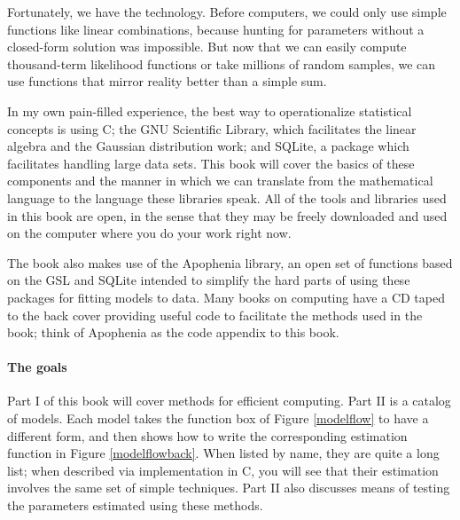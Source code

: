 Fortunately, we have the technology. Before computers, we could only
use simple functions like linear combinations, because hunting for
parameters without a closed-form solution was impossible. 
But now that we can easily compute thousand-term likelihood functions
or take millions of random samples, we can use functions that mirror
reality better than a simple sum.


In my own pain-filled experience, the best way to operationalize
statistical concepts is using C; the GNU Scientific Library,  which
facilitates the linear algebra and the Gaussian distribution work;
and SQLite, a package which facilitates handling large data sets. This
book will cover the basics of these components and the manner in which
we can translate from the mathematical language to the language these
libraries speak.  All of the tools and libraries
used in this book are open, in the sense that they may be freely
downloaded and used on the computer where you do your work right now.

The book also makes use of the Apophenia library, an open set of
functions based on the GSL and SQLite intended to simplify the hard
parts of using these packages for fitting models to data. Many books on
computing have a CD taped to the back cover providing useful code to
facilitate the methods used in the book; think of Apophenia as the code
appendix to this book.

\paragraph{The goals}
Part I of this book will cover methods for efficient computing. Part II
is a catalog of models. Each model takes the
function box of Figure \ref{modelflow} to have a different form, and
then shows how to write the corresponding estimation function in Figure
\ref{modelflowback}. When listed by name, they are quite a long list; when
described via implementation in C, you will see that their estimation
involves the same set of simple techniques.  Part II also discusses
means of testing the parameters estimated using these methods.

